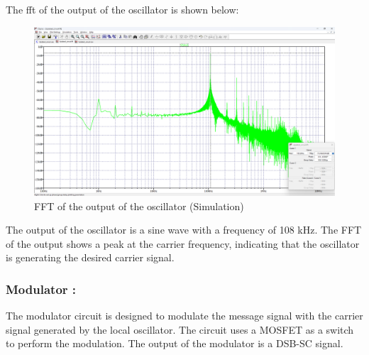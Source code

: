 \documentclass[conference]{IEEEtran}
\begin{document}
The fft of the output of the oscillator is shown below:
\begin{figure}
    \centering
    \includegraphics[width=1\linewidth]{Images/fft_sine_osc.png}
    \caption{FFT of the output of the oscillator (Simulation)}
\end{figure}
The output of the oscillator is a sine wave with a frequency of 108 kHz. The FFT of the output shows a peak at the carrier frequency, indicating that the oscillator is generating the desired carrier signal.

\subsubsection{Modulator :}
The modulator circuit is designed to modulate the message signal with the carrier signal generated by the local oscillator. The circuit uses a MOSFET as a switch to perform the modulation. The output of the modulator is a DSB-SC signal.
\end{document}
